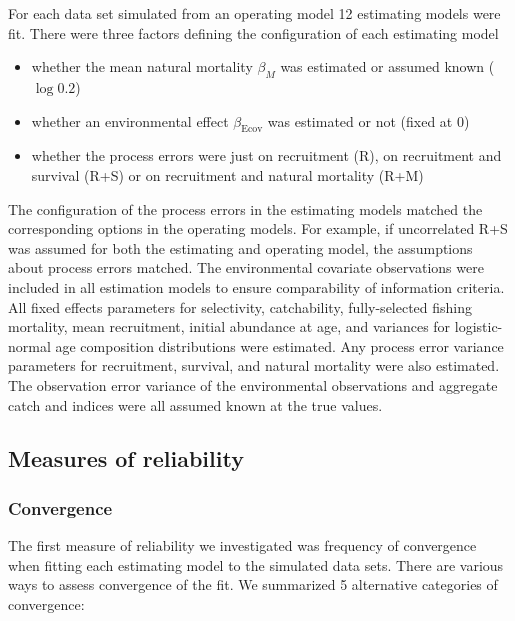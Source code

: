 \documentclass[
  12pt,
]{article}
\begin{document}
For each data set simulated from an operating model 12 estimating models
were fit. There were three factors defining the configuration of each
estimating model

\begin{itemize}
\item whether the mean natural mortality $\beta_M$ was estimated or assumed known ($\log 0.2$)
\item whether an environmental effect $\beta_\text{Ecov}$ was estimated or not (fixed at 0)
\item whether the process errors were just on recruitment (R), on recruitment and survival (R+S) or on recruitment and natural mortality (R+M)
\end{itemize}

The configuration of the process errors in the estimating models matched
the corresponding options in the operating models. For example, if
uncorrelated R+S was assumed for both the estimating and operating
model, the assumptions about process errors matched. The environmental
covariate observations were included in all estimation models to ensure
comparability of information criteria. All fixed effects parameters for
selectivity, catchability, fully-selected fishing mortality, mean
recruitment, initial abundance at age, and variances for logistic-normal
age composition distributions were estimated. Any process error variance
parameters for recruitment, survival, and natural mortality were also
estimated. The observation error variance of the environmental
observations and aggregate catch and indices were all assumed known at
the true values.

\hypertarget{measures-of-reliability}{%
\subsection*{Measures of reliability}\label{measures-of-reliability}}

\hypertarget{convergence}{%
\subsubsection*{Convergence}\label{convergence}}

The first measure of reliability we investigated was frequency of
convergence when fitting each estimating model to the simulated data
sets. There are various ways to assess convergence of the fit. We
summarized 5 alternative categories of convergence:
\end{document}
